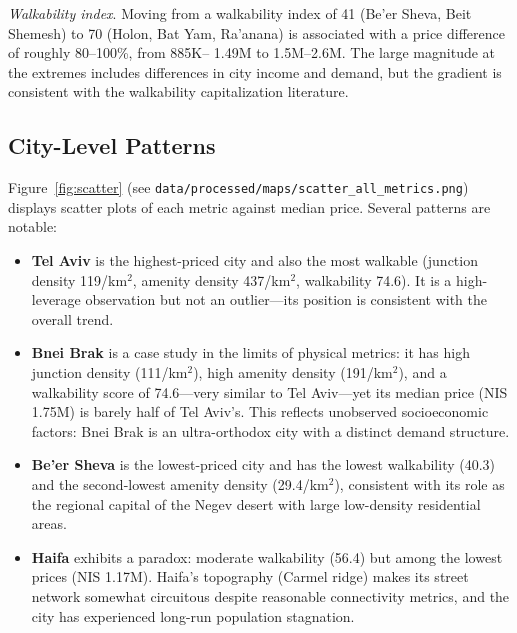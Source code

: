 \documentclass[12pt,a4paper]{article}
\begin{document}
\textit{Walkability index}.  Moving from a walkability index of 41 (Be'er
Sheva, Beit Shemesh) to 70 (Holon, Bat Yam, Ra'anana) is associated with a
price difference of roughly 80--100\%, from \textsterling 885K--\textsterling
1.49M to \textsterling 1.5M--\textsterling 2.6M.  The large magnitude at the
extremes includes differences in city income and demand, but the gradient is
consistent with the walkability capitalization literature.

\subsection{City-Level Patterns}
\label{sec:results_cities}

Figure~\ref{fig:scatter} (see \texttt{data/processed/maps/scatter\_all\_metrics.png})
displays scatter plots of each metric against median price.  Several patterns
are notable:

\begin{itemize}
  \item \textbf{Tel Aviv} is the highest-priced city and also the most walkable
    (junction density 119/km$^2$, amenity density 437/km$^2$, walkability 74.6).
    It is a high-leverage observation but not an outlier—its position is
    consistent with the overall trend.

  \item \textbf{Bnei Brak} is a case study in the limits of physical metrics:
    it has high junction density (111/km$^2$), high amenity density
    (191/km$^2$), and a walkability score of 74.6—very similar to Tel Aviv—yet
    its median price (NIS 1.75M) is barely half of Tel Aviv's.  This reflects
    unobserved socioeconomic factors: Bnei Brak is an ultra-orthodox city with
    a distinct demand structure.

  \item \textbf{Be'er Sheva} is the lowest-priced city and has the lowest
    walkability (40.3) and the second-lowest amenity density (29.4/km$^2$),
    consistent with its role as the regional capital of the Negev desert with
    large low-density residential areas.

  \item \textbf{Haifa} exhibits a paradox: moderate walkability (56.4) but
    among the lowest prices (NIS 1.17M).  Haifa's topography (Carmel ridge)
    makes its street network somewhat circuitous despite reasonable connectivity
    metrics, and the city has experienced long-run population stagnation.
\end{itemize}
\end{document}
